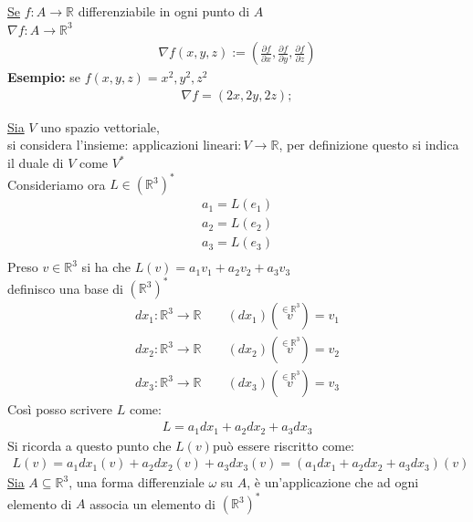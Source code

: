 \documentclass[a4paper, oneside]{article}
\begin{document}
\begin{example}
    \underline{Se} $f:A \to \mathbb{R}$ differenziabile in ogni punto di $A$\\
     $\nabla f:A\to \mathbb{R}^3$
    \begin{gather*}
        \nabla f(x,y,z) := \left( \frac{\partial f}{\partial x},\frac{\partial f}{\partial y},\frac{\partial f}{\partial z} \right)
    \end{gather*}
    \textbf{Esempio:} se $f(x,y,z) = x^2,y^2,z^2$
    \begin{gather*}
        \nabla f=(2x,2y,2z);
    \end{gather*} 
\end{example}
\begin{definition}
    \underline{Sia} $V$ uno spazio vettoriale,\\
    si considera l'insieme: $\text{applicazioni lineari} :V \to \mathbb{R}$, per definizione questo si indica il duale di $V$ come $V^*$\\
    Consideriamo ora $L \in (\mathbb{R}^{3})^*$
    \begin{gather*}
        a_1=L(e_1)\\
        a_2=L(e_2)\\
        a_3=L(e_3)\\
    \end{gather*}
    Preso $v \in \mathbb{R}^3$ si ha che $L(v) = a_1v_1+a_2v_2+a_3v_3$\\
    definisco una base di $(\mathbb{R}^3)^*$
    \begin{gather*}
        dx_1 : \mathbb{R}^3 \to \mathbb{R} \qquad (dx_1)(\overset{\in \mathbb{R}^3}{v}) = v_1\\
        dx_2 : \mathbb{R}^3 \to \mathbb{R} \qquad (dx_2)(\overset{\in \mathbb{R}^3}{v}) = v_2\\
        dx_3 : \mathbb{R}^3 \to \mathbb{R} \qquad (dx_3)(\overset{\in \mathbb{R}^3}{v}) = v_3
    \end{gather*}
    Così posso scrivere $L$ come:
    \begin{gather*}
        L = a_1 dx_1 + a_2 dx_2 + a_3 dx_3
    \end{gather*}
    Si ricorda a questo punto che $L(v)$può essere riscritto come:
    \begin{gather*}
        L(v) = a_1 dx_1(v) + a_2 dx_2(v) + a_3 dx_3(v) = (a_1 dx_1 + a_2 dx_2 + a_3 dx_3)(v)
    \end{gather*}
    \underline{Sia} $A \subseteq \mathbb{R}^3$, una forma differenziale $\omega$ su $A$, è un'applicazione che ad ogni elemento di $A$ associa un elemento di $(\mathbb{R}^3)^*$ 

\end{definition}
\end{document}
